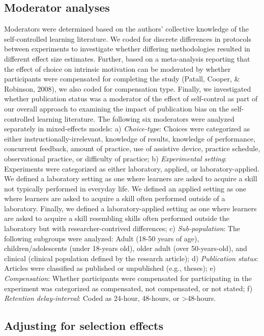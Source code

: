 \documentclass[
  english,
  man,floatsintext]{apa7}
\begin{document}
\hypertarget{moderator-analyses}{%
\subsection{Moderator analyses}\label{moderator-analyses}}

Moderators were determined based on the authors' collective knowledge of the self-controlled learning literature. We coded for discrete differences in protocols between experiments to investigate whether differing methodologies resulted in different effect size estimates. Further, based on a meta-analysis reporting that the effect of choice on intrinsic motivation can be moderated by whether participants were compensated for completing the study (Patall, Cooper, \& Robinson, 2008), we also coded for compensation type. Finally, we investigated whether publication status was a moderator of the effect of self-control as part of our overall approach to examining the impact of publication bias on the self-controlled learning literature. The following six moderators were analyzed separately in mixed-effects models: a) \emph{Choice-type}: Choices were categorized as either instructionally-irrelevant, knowledge of results, knowledge of performance, concurrent feedback, amount of practice, use of assistive device, practice schedule, observational practice, or difficulty of practice; b) \emph{Experimental setting}: Experiments were categorized as either laboratory, applied, or laboratory-applied. We defined a laboratory setting as one where learners are asked to acquire a skill not typically performed in everyday life. We defined an applied setting as one where learners are asked to acquire a skill often performed outside of a laboratory. Finally, we defined a laboratory-applied setting as one where learners are asked to acquire a skill resembling skills often performed outside the laboratory but with researcher-contrived differences; c) \emph{Sub-population}: The following subgroups were analyzed: Adult (18-50 years of age), children/adolescents (under 18-years old), older adult (over 50-years-old), and clinical (clinical population defined by the research article); d) \emph{Publication status}: Articles were classified as published or unpublished (e.g., theses); e) \emph{Compensation}: Whether participants were compensated for participating in the experiment was categorized as compensated, not compensated, or not stated; f) \emph{Retention delay-interval}: Coded as 24-hour, 48-hours, or \textgreater48-hours.

\hypertarget{adjusting-for-selection-effects}{%
\subsection{Adjusting for selection effects}\label{adjusting-for-selection-effects}}
\end{document}
